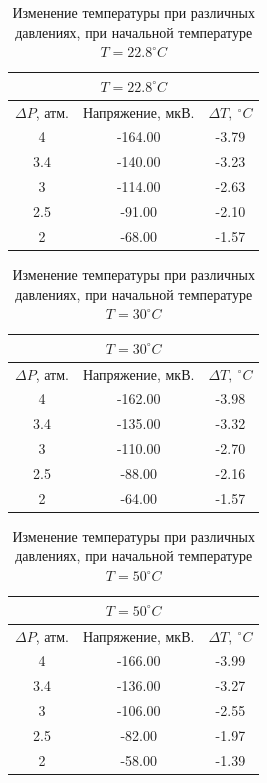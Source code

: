 \documentclass[a4paper, 12pt]{article}
\begin{document}
\begin{table}[h]
    \centering
    \begin{tabular}{|c|c|c|}\hline
    \multicolumn{3}{|c|}{$T = 22.8^\circ C$}\\ \hline
    $\Delta P$, атм.	& Напряжение, мкВ.	& $\Delta T,~^\circ C$	\\ \hline
    4	& -164.00	& -3.79	\\ \hline
    3.4	& -140.00	& -3.23	\\ \hline
    3	& -114.00	& -2.63	\\ \hline
    2.5	& -91.00	& -2.10	\\ \hline
    2	& -68.00	& -1.57	\\ \hline
    \end{tabular}
    \caption{Изменение температуры при различных давлениях, при начальной температуре $T = 22.8^\circ C$}
    \label{tabl:data_22.8}
    \end{table}
    
    
    \begin{table}[h]
    \centering
    \begin{tabular}{|c|c|c|}\hline
    \multicolumn{3}{|c|}{$T = 30^\circ C$}\\ \hline
    $\Delta P$, атм.	& Напряжение, мкВ.	& $\Delta T,~^\circ C$	\\ \hline
    4	& -162.00	& -3.98	\\ \hline
    3.4	& -135.00	& -3.32	\\ \hline
    3	& -110.00	& -2.70	\\ \hline
    2.5	& -88.00	& -2.16	\\ \hline
    2	& -64.00	& -1.57	\\ \hline
    \end{tabular}
    \caption{Изменение температуры при различных давлениях, при начальной температуре $T = 30^\circ C$}
    \label{tabl:data_30}
    \end{table}
    
    
    \begin{table}[h]
    \centering
    \begin{tabular}{|c|c|c|}\hline
    \multicolumn{3}{|c|}{$T = 50^\circ C$}\\ \hline
    $\Delta P$, атм.	& Напряжение, мкВ.	& $\Delta T,~^\circ C$	\\ \hline
    4	& -166.00	& -3.99	\\ \hline
    3.4	& -136.00	& -3.27	\\ \hline
    3	& -106.00	& -2.55	\\ \hline
    2.5	& -82.00	& -1.97	\\ \hline
    2	& -58.00	& -1.39	\\ \hline
    \end{tabular}
    \caption{Изменение температуры при различных давлениях, при начальной температуре $T = 50^\circ C$}
    \label{tabl:data_50}
    \end{table}
\end{document}
